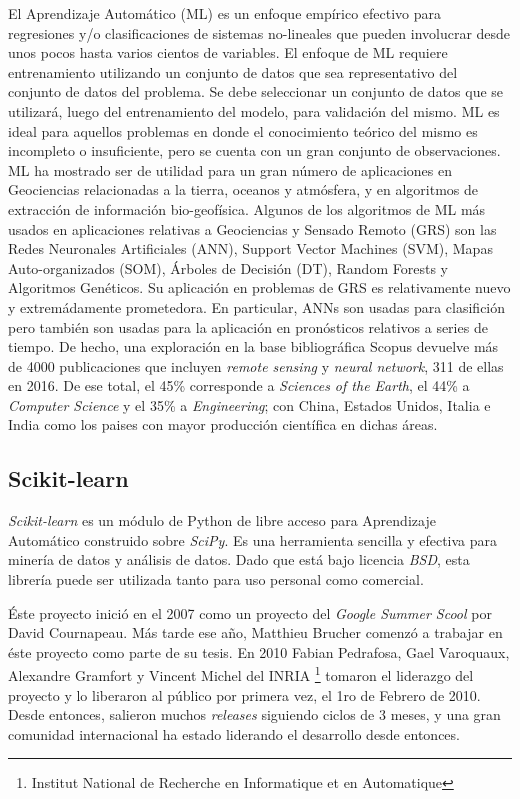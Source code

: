   El Aprendizaje Automático (ML) es un enfoque empírico efectivo para
  regresiones y/o clasificaciones de sistemas no-lineales que pueden involucrar desde
  unos pocos hasta varios cientos de variables. El enfoque de ML requiere
  entrenamiento utilizando un conjunto de datos que sea representativo del conjunto
  de datos del problema. Se debe seleccionar un conjunto de datos que se utilizará,
  luego del entrenamiento del modelo, para validación del mismo.
  ML es ideal para aquellos problemas en donde el conocimiento teórico del mismo
  es incompleto o insuficiente, pero se cuenta con un gran conjunto de observaciones.
  ML ha mostrado ser de utilidad para un gran número de aplicaciones en Geociencias
  relacionadas a la tierra, oceanos y atmósfera, y en algoritmos de extracción
  de información bio-geofísica.
  Algunos de los algoritmos de ML más usados en aplicaciones relativas a
  Geociencias y Sensado Remoto (GRS) son las Redes Neuronales Artificiales (ANN),
  Support Vector Machines (SVM), Mapas Auto-organizados (SOM), Árboles de Decisión (DT),
  Random Forests y Algoritmos Genéticos. Su aplicación en problemas de GRS es
  relativamente nuevo y extremádamente prometedora. En particular, ANNs son
  usadas para clasifición pero también son usadas para la aplicación en pronósticos
  relativos a series de tiempo.
  De hecho, una exploración en la base bibliográfica Scopus devuelve más de 4000
  publicaciones que incluyen \textit{remote sensing} y \textit{neural network},
  311 de ellas en 2016. De ese total, el 45\% corresponde a
  \textit{Sciences of the Earth}, el 44\% a \textit{Computer Science} y el 35\% a
  \textit{Engineering}; con China, Estados Unidos, Italia e India como los paises
  con mayor producción científica en dichas áreas.


  \subsection{Scikit-learn}

    \par \textit{Scikit-learn}\cite{scikit-learn, sklearn_review} es un módulo
      de Python de libre acceso para Aprendizaje Automático
      construido sobre \textit{SciPy}\cite{scipy}. Es una herramienta
      sencilla y efectiva para minería de datos y análisis de datos. Dado que está bajo
      licencia \textit{BSD}, esta librería puede ser utilizada tanto
      para uso personal como comercial.

    \par Éste proyecto inició en el 2007 como un proyecto del \textit{Google Summer Scool} por David
      Cournapeau. Más tarde ese año, Matthieu Brucher comenzó a trabajar en éste proyecto
      como parte de su tesis. En 2010 Fabian Pedrafosa, Gael Varoquaux, Alexandre
      Gramfort y Vincent Michel del INRIA \footnote{Institut National de Recherche
      en Informatique et en Automatique} tomaron el liderazgo del proyecto y lo liberaron
      al público por primera vez, el 1ro de Febrero de 2010. Desde entonces, salieron muchos
      \textit{releases} siguiendo ciclos de 3 meses, y una gran comunidad internacional
      ha estado liderando el desarrollo desde entonces.

